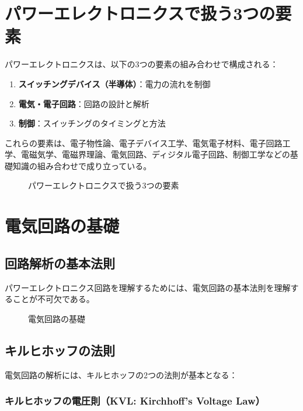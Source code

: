 \section{パワーエレクトロニクスで扱う3つの要素}

パワーエレクトロニクスは、以下の3つの要素の組み合わせで構成される：

\begin{enumerate}
\item \textbf{スイッチングデバイス（半導体）}：電力の流れを制御
\item \textbf{電気・電子回路}：回路の設計と解析
\item \textbf{制御}：スイッチングのタイミングと方法
\end{enumerate}

これらの要素は、電子物性論、電子デバイス工学、電気電子材料、電子回路工学、電磁気学、電磁界理論、電気回路、ディジタル電子回路、制御工学などの基礎知識の組み合わせで成り立っている。

\begin{figure}[H]
\centering
{}
\caption{パワーエレクトロニクスで扱う3つの要素}
\label{fig:three_elements}
\end{figure}

\section{電気回路の基礎}

\subsection{回路解析の基本法則}

パワーエレクトロニクス回路を理解するためには、電気回路の基本法則を理解することが不可欠である。

\begin{figure}[H]
\centering
{}
\caption{電気回路の基礎}
\label{fig:circuit_basics}
\end{figure}

\subsection{キルヒホッフの法則}

電気回路の解析には、キルヒホッフの2つの法則が基本となる：

\subsubsection{キルヒホッフの電圧則（KVL: Kirchhoff's Voltage Law）}

